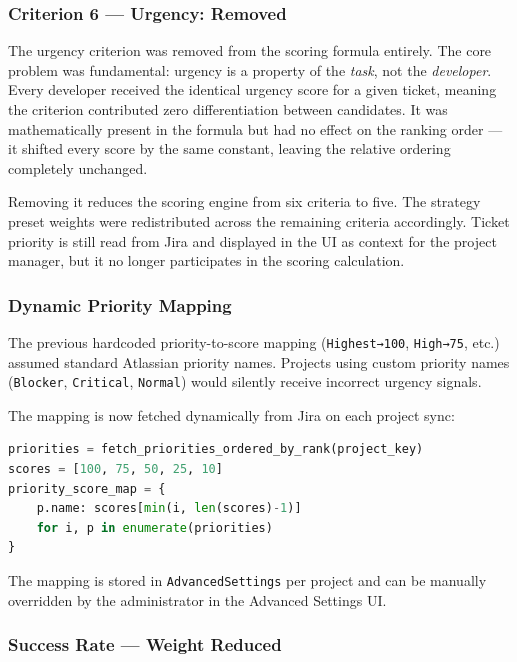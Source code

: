 \documentclass[12pt, a4paper]{article}
\begin{document}
\subsubsection{Criterion 6 — Urgency: Removed}

The urgency criterion was removed from the scoring formula entirely. The core
problem was fundamental: urgency is a property of the \textit{task}, not the
\textit{developer}. Every developer received the identical urgency score for a
given ticket, meaning the criterion contributed zero differentiation between
candidates. It was mathematically present in the formula but had no effect on
the ranking order — it shifted every score by the same constant, leaving the
relative ordering completely unchanged.

Removing it reduces the scoring engine from six criteria to five. The strategy
preset weights were redistributed across the remaining criteria accordingly.
Ticket priority is still read from Jira and displayed in the UI as context for
the project manager, but it no longer participates in the scoring calculation.

\subsubsection{Dynamic Priority Mapping}

The previous hardcoded priority-to-score mapping (\texttt{Highest→100}, \texttt{High→75}, etc.) assumed standard Atlassian priority names. Projects using custom priority names (\texttt{Blocker}, \texttt{Critical}, \texttt{Normal}) would silently receive incorrect urgency signals.

The mapping is now fetched dynamically from Jira on each project sync:

\begin{lstlisting}[language=Python, caption={Dynamic priority mapping}]
priorities = fetch_priorities_ordered_by_rank(project_key)
scores = [100, 75, 50, 25, 10]
priority_score_map = {
    p.name: scores[min(i, len(scores)-1)]
    for i, p in enumerate(priorities)
}
\end{lstlisting}

The mapping is stored in \texttt{AdvancedSettings} per project and can be manually overridden by the administrator in the Advanced Settings UI.

\subsubsection{Success Rate — Weight Reduced}
\end{document}
